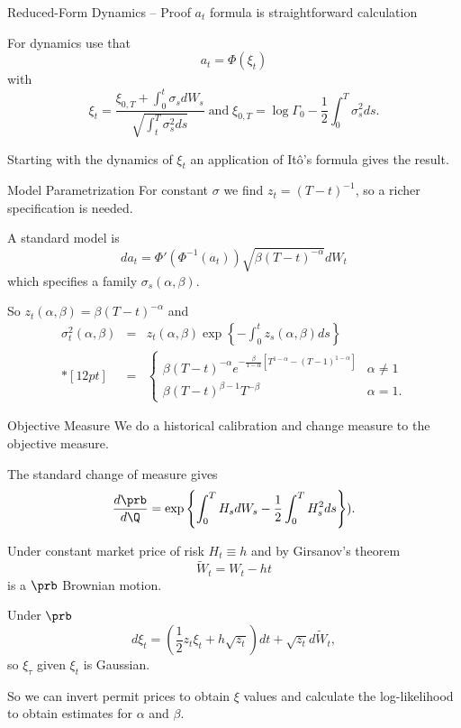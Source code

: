 Reduced-Form Dynamics -- Proof
	$a_t$ formula is straightforward calculation
	
	For dynamics use that
		$$
		a_t = \Phi(\xi_t)
		$$
	with
		$$
		\xi_t = \frac{\xi_{0,T}+\int_0^t\sigma_s dW_s}{\sqrt{\int_t^T\sigma_s^2ds}}\; \mbox{and}\;  \xi_{0,T}=\log \Gamma_0 - \frac{1}{2} \int_0^T\sigma_s^2ds.
		$$
	
	Starting with the dynamics of $\xi_t$ an application of It{\^o}'s formula gives the result.



Model Parametrization
	For constant $\sigma$ we find $z_t=(T-t)^{-1}$, so a richer specification is needed.
	
	A standard model is
		$$
		da_t = \Phi'\left(\Phi^{-1}(a_t)\right)\sqrt{\beta(T-t)^{-\alpha}}dW_t
		$$
	which specifies a family $\sigma_s(\alpha,\beta)$.

	So $z_t(\alpha, \beta) = \beta(T-t)^{-\alpha}$ and
		$$
		\begin{array}{lll}
		\sigma_t^2(\alpha,\beta)&=& \displaystyle z_t(\alpha, \beta) \exp\left\{-\int_0^t z_s(\alpha, \beta) ds \right\}\\*[12pt]
		&=&\displaystyle
		\left\{
		\begin{array}{ll}
		\beta(T-t)^{-\alpha} e^{-\frac{\beta}{1-\alpha}[T^{1-\alpha}-(T-1)^{1-\alpha}]} &\alpha \not=1\\
		\beta(T-t)^{\beta-1}T^{-\beta} &\alpha=1.
		\end{array}
		\right.
		\end{array}
		$$


Objective Measure
	We do a historical calibration and change measure to the objective measure.
	
	The standard change of measure gives
		$$
		\frac{d\prb}{d\Q} = \exp\left\{\int_0^T H_s dW_s -\frac{1}{2} \int_0^T H_s^2ds \right\}).
		$$

	Under constant market price of risk $H_t \equiv h$ and by Girsanov's theorem
		$$
		\tilde{W}_t = W_t - ht
		$$
	is a $\prb$ Brownian motion.

	Under $\prb$
		$$
		d\xi_t = \left(\frac{1}{2} z_t \xi_t + h \sqrt{z_t} \right)dt + \sqrt{z_t} d\tilde{W}_t,
		$$	
	so $\xi_{\tau}$ given $\xi_t$ is Gaussian.
	
	So we can invert permit prices to obtain $\xi$ values and calculate the log-likelihood to obtain
	estimates for $\alpha$ and $\beta$.


